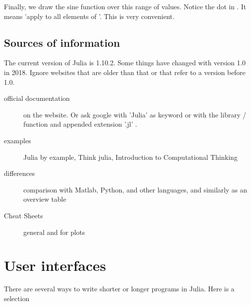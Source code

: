 Finally, we draw the sine function over this range of values. Notice the dot in . It means 'apply  to all elements of '. This is very convenient.


\subsection{Sources of information}

The current version of Julia is 1.10.2. Some things have changed with version 1.0 in 2018. Ignore websites that are older than that or that refer to a version before 1.0.

\begin{description}

\item[official documentation] on the website. Or ask google with 'Julia' as keyword or with the library / function and appended extension '.jl' .

\item[examples] Julia by example, Think julia, Introduction to Computational Thinking

\item[differences] comparison with Matlab, Python, and other languages, and similarly as an overview table

\item[Cheat Sheets] general and for plots 

\end{description}


\section{User interfaces}


There are several ways to write shorter or longer programs in Julia. Here is a selection


